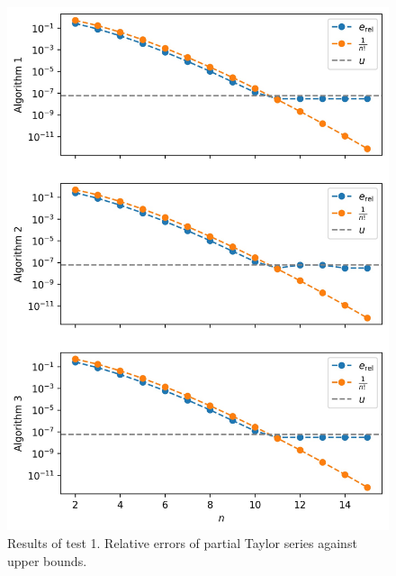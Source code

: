 \documentclass[12pt]{article}
\theoremstyle{definition}
\begin{document}
\begin{figure}[H]
\centering
\includegraphics{test1.jpeg}
\caption{Results of test 1. Relative errors of partial Taylor series against upper bounds.}
\label{test1}
\end{figure}
\end{document}
